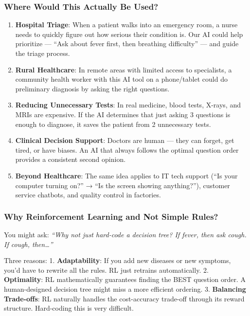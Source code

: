 \documentclass[
]{article}
\begin{document}
\hypertarget{where-would-this-actually-be-used}{%
\subsubsection{Where Would This Actually Be
Used?}\label{where-would-this-actually-be-used}}

\begin{enumerate}
\def\labelenumi{\arabic{enumi}.}
\item
  \textbf{Hospital Triage}: When a patient walks into an emergency room,
  a nurse needs to quickly figure out how serious their condition is.
  Our AI could help prioritize --- ``Ask about fever first, then
  breathing difficulty'' --- and guide the triage process.
\item
  \textbf{Rural Healthcare}: In remote areas with limited access to
  specialists, a community health worker with this AI tool on a
  phone/tablet could do preliminary diagnosis by asking the right
  questions.
\item
  \textbf{Reducing Unnecessary Tests}: In real medicine, blood tests,
  X-rays, and MRIs are expensive. If the AI determines that just asking
  3 questions is enough to diagnose, it saves the patient from 2
  unnecessary tests.
\item
  \textbf{Clinical Decision Support}: Doctors are human --- they can
  forget, get tired, or have biases. An AI that always follows the
  optimal question order provides a consistent second opinion.
\item
  \textbf{Beyond Healthcare}: The same idea applies to IT tech support
  (``Is your computer turning on?'' → ``Is the screen showing
  anything?''), customer service chatbots, and quality control in
  factories.
\end{enumerate}

\hypertarget{why-reinforcement-learning-and-not-simple-rules}{%
\subsubsection{Why Reinforcement Learning and Not Simple
Rules?}\label{why-reinforcement-learning-and-not-simple-rules}}

You might ask: \emph{``Why not just hard-code a decision tree? If fever,
then ask cough. If cough, then\ldots{}''}

Three reasons: 1. \textbf{Adaptability}: If you add new diseases or new
symptoms, you'd have to rewrite all the rules. RL just retrains
automatically. 2. \textbf{Optimality}: RL mathematically guarantees
finding the BEST question order. A human-designed decision tree might
miss a more efficient ordering. 3. \textbf{Balancing Trade-offs}: RL
naturally handles the cost-accuracy trade-off through its reward
structure. Hard-coding this is very difficult.
\end{document}
